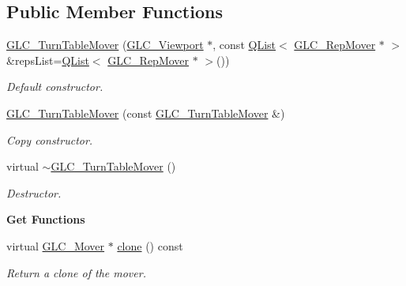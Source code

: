 \subsection*{Public Member Functions}
\begin{DoxyCompactItemize}
\item 
\hyperlink{class_g_l_c___turn_table_mover_ad041979ad0edd1597f69379c014e1153}{G\-L\-C\-\_\-\-Turn\-Table\-Mover} (\hyperlink{class_g_l_c___viewport}{G\-L\-C\-\_\-\-Viewport} $\ast$, const \hyperlink{class_q_list}{Q\-List}$<$ \hyperlink{class_g_l_c___rep_mover}{G\-L\-C\-\_\-\-Rep\-Mover} $\ast$ $>$ \&reps\-List=\hyperlink{class_q_list}{Q\-List}$<$ \hyperlink{class_g_l_c___rep_mover}{G\-L\-C\-\_\-\-Rep\-Mover} $\ast$ $>$())
\begin{DoxyCompactList}\small\item\em Default constructor. \end{DoxyCompactList}\item 
\hyperlink{class_g_l_c___turn_table_mover_a872953539e611dfbab7349ff5d8bcecf}{G\-L\-C\-\_\-\-Turn\-Table\-Mover} (const \hyperlink{class_g_l_c___turn_table_mover}{G\-L\-C\-\_\-\-Turn\-Table\-Mover} \&)
\begin{DoxyCompactList}\small\item\em Copy constructor. \end{DoxyCompactList}\item 
virtual \hyperlink{class_g_l_c___turn_table_mover_a0d485c541d82d70be69e070bdc708d1d}{$\sim$\-G\-L\-C\-\_\-\-Turn\-Table\-Mover} ()
\begin{DoxyCompactList}\small\item\em Destructor. \end{DoxyCompactList}\end{DoxyCompactItemize}
\begin{Indent}{\bf Get Functions}\par
\begin{DoxyCompactItemize}
\item 
virtual \hyperlink{class_g_l_c___mover}{G\-L\-C\-\_\-\-Mover} $\ast$ \hyperlink{class_g_l_c___turn_table_mover_a313753abe6c9a336e15de78b4919af68}{clone} () const 
\begin{DoxyCompactList}\small\item\em Return a clone of the mover. \end{DoxyCompactList}\end{DoxyCompactItemize}
\end{Indent}
